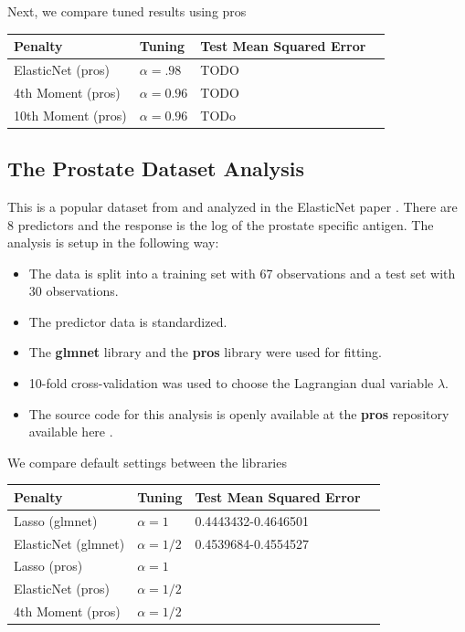 \documentclass[article]{jss}
\numberwithin{equation}{section}
\begin{document}
Next, we compare tuned results using pros

\begin{center}
\setlength{\tabcolsep}{20pt} %
\renewcommand{\arraystretch}{1} %
\begin{tabular}{lllp{7.4cm}}
\hline
Penalty & Tuning & Test Mean Squared Error \\ \hline
ElasticNet (pros) & $\alpha = .98$ & TODO \\
4th Moment (pros) & $\alpha = 0.96$ &  TODO \\
10th Moment (pros) & $\alpha = 0.96$ &  TODo \\ \hline
\end{tabular}
\end{center}

\subsection{The Prostate Dataset Analysis}

This is a popular dataset from \cite{prostate} and analyzed in the ElasticNet paper \cite{elasticnet}.
There are 8 predictors and the response is the log of the prostate specific antigen. The analysis is setup in the following way:

\begin{itemize}
\item The data is split into a training set with 67 observations and a test set with 30 observations.

\item The predictor data is standardized.

\item The \textbf{glmnet} library and the \textbf{pros} library were used for fitting.

\item 10-fold cross-validation was used to choose the Lagrangian dual variable $\lambda$.

\item The source code for this analysis is openly available at the \textbf{pros} repository available here \cite{pros}.

\end{itemize}


We compare default settings between the libraries

\begin{center}
\setlength{\tabcolsep}{20pt} %
\renewcommand{\arraystretch}{1} %
\begin{tabular}{lllp{7.4cm}}
\hline
Penalty & Tuning & Test Mean Squared Error \\ \hline
Lasso (glmnet) & $\alpha = 1$ & 0.4443432-0.4646501 \\
ElasticNet (glmnet) & $\alpha = 1/2$  & 0.4539684-0.4554527   \\
Lasso (pros) & $\alpha = 1$ &  \\
ElasticNet (pros) & $\alpha = 1/2$ &  \\
4th Moment (pros) & $\alpha = 1/2$ &  \\ \hline
\end{tabular}
\end{center}
\end{document}
